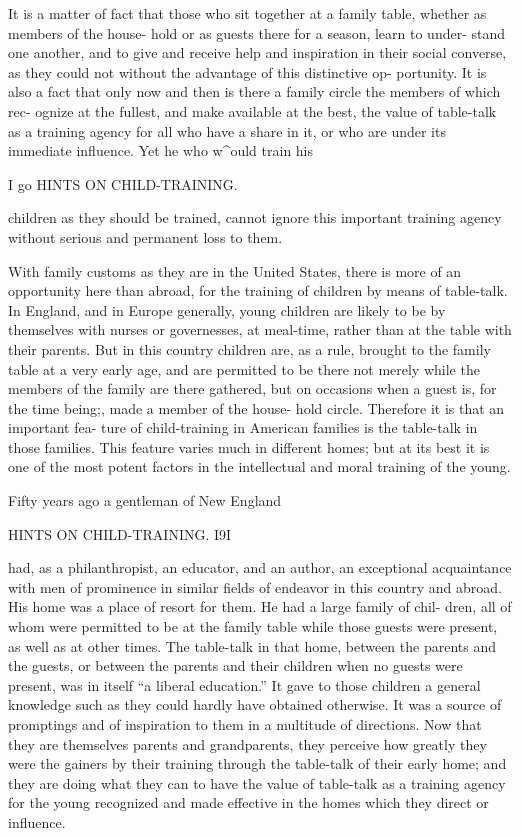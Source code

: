 \documentclass[
]{book}
\begin{document}
It is a matter of fact that those who sit together at a family table, whether as members of the house- hold or as guests there for a season, learn to under- stand one another, and to give and receive help and inspiration in their social converse, as they could not without the advantage of this distinctive op- portunity. It is also a fact that only now and then is there a family circle the members of which rec- ognize at the fullest, and make available at the best, the value of table-talk as a training agency for all who have a share in it, or who are under its immediate influence. Yet he who w\^{}ould train his

I go HINTS ON CHILD-TRAINING.

children as they should be trained, cannot ignore this important training agency without serious and permanent loss to them.

With family customs as they are in the United States, there is more of an opportunity here than abroad, for the training of children by means of table-talk. In England, and in Europe generally, young children are likely to be by themselves with nurses or governesses, at meal-time, rather than at the table with their parents. But in this country children are, as a rule, brought to the family table at a very early age, and are permitted to be there not merely while the members of the family are there gathered, but on occasions when a guest is, for the time being;, made a member of the house- hold circle. Therefore it is that an important fea- ture of child-training in American families is the table-talk in those families. This feature varies much in different homes; but at its best it is one of the most potent factors in the intellectual and moral training of the young.

Fifty years ago a gentleman of New England

HINTS ON CHILD-TRAINING. I9I

had, as a philanthropist, an educator, and an author, an exceptional acquaintance with men of prominence in similar fields of endeavor in this country and abroad. His home was a place of resort for them. He had a large family of chil- dren, all of whom were permitted to be at the family table while those guests were present, as well as at other times. The table-talk in that home, between the parents and the guests, or between the parents and their children when no guests were present, was in itself ``a liberal education.'' It gave to those children a general knowledge such as they could hardly have obtained otherwise. It was a source of promptings and of inspiration to them in a multitude of directions. Now that they are themselves parents and grandparents, they perceive how greatly they were the gainers by their training through the table-talk of their early home; and they are doing what they can to have the value of table-talk as a training agency for the young recognized and made effective in the homes which they direct or influence.
\end{document}
